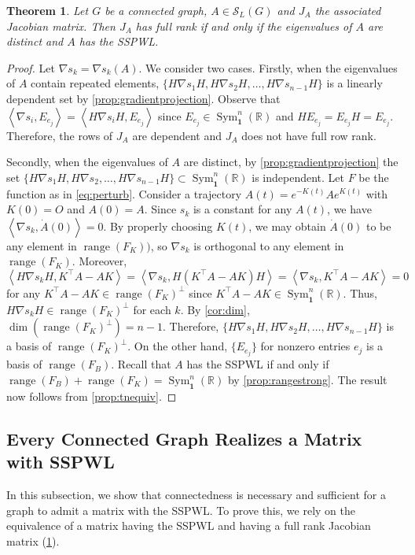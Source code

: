 \documentclass{article}
\newtheorem{theorem}{Theorem}[section]
\theoremstyle{definition}
\newcommand{\trans}{^\top}
\newcommand{\inp}[2]{\left\langle#1,#2\right\rangle}
\newcommand{\bone}{\mathbf{1}}
\newcommand{\range}{\operatorname{range}}
\newcommand{\msymz}[1][n]{\operatorname{Sym}_{\bone}^{#1}(\mathbb{R})}
\newcommand{\mptn}{\mathcal{S}}
\begin{document}
\begin{theorem}
\label{thm.SSPWL-Jac}
Let $G$ be a connected graph,  $A\in\mptn_L(G)$ and $J_A$ the associated Jacobian matrix.  Then   $J_A$ has full rank if and only if the eigenvalues of $A$ are distinct and $A$ has the SSPWL.
\end{theorem}
\begin{proof}
Let $\nabla s_k = \nabla s_k(A)$.  We consider two cases.  Firstly, when the eigenvalues of $A$ contain repeated elements, $\{H\nabla s_1H, H\nabla s_2H, \ldots, H\nabla s_{n-1}H\}$ is a linearly dependent set by \cref{prop:gradientprojection}.  Observe that $\inp{\nabla s_i}{E_{e_j}} = \inp{H\nabla s_iH}{E_{e_j}}$ since $E_{e_j}\in\msymz$ and $HE_{e_j} = E_{e_j}H = E_{e_j}$.  Therefore, the rows of $J_A$ are dependent and $J_A$ does not have full row rank.  

Secondly, when the eigenvalues of $A$ are distinct, by \cref{prop:gradientprojection} the set $\{H\nabla s_1H, H\nabla s_2, \ldots, H\nabla s_{n-1}H\}\subset \msymz$ is independent.  Let $F$ be the function as in \cref{eq:perturb}.  Consider a trajectory $A(t) = e^{-K(t)}Ae^{K(t)}$ with $K(0) = O$ and $A(0) = A$.  Since $s_k$ is a constant for any $A(t)$, we have $\inp{\nabla s_k}{\dot{A}(0)} = 0$.  By properly choosing $K(t)$, we may obtain $\dot{A}(0)$ to be any element in $\range(F_K))$, so $\nabla s_k$ is orthogonal to any element in $\range(F_K)$.  Moreover, 
\[
    \inp{H\nabla s_kH}{K\trans A - AK} = \inp{\nabla s_k}{H(K\trans A - AK)H} = \inp{\nabla s_k}{K\trans A - AK} = 0
\]
for any $K\trans A - AK\in\range(F_K)^\perp$ since $K\trans A - AK\in\msymz$.  Thus, $H\nabla s_kH\in\range(F_K)^\perp$ for each $k$.  By \cref{cor:dim}, $\dim(\range(F_K)^\perp) = n - 1$.  Therefore, $\{H\nabla s_1H, H\nabla s_2H, \ldots, H\nabla s_{n-1}H\}$ is a basis of $\range(F_K)^\perp$.  On the other hand, $\{E_{e_j}\}$ for nonzero entries $e_j$ is a basis of $\range(F_B)$.  Recall that $A$ has the SSPWL if and only if $\range(F_B) + \range(F_K) = \msymz$ by \cref{prop:rangestrong}.  The result now follows from \cref{prop:tnequiv}.
\end{proof}

\subsection{Every Connected Graph Realizes a Matrix with SSPWL}

In this subsection, we show that connectedness  is necessary  and sufficient for a graph to admit a matrix with the SSPWL. To prove this, we rely on the equivalence of a matrix having the SSPWL and  having a full rank Jacobian matrix (\cref{thm.SSPWL-Jac}).
\end{document}
